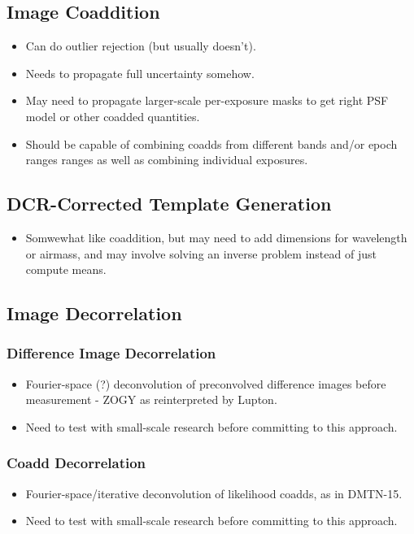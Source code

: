 \subsection{Image Coaddition}
\begin{itemize}
\item Can do outlier rejection (but usually doesn't).
\item Needs to propagate full uncertainty somehow.
\item May need to propagate larger-scale per-exposure masks to get right PSF model or other coadded quantities.
\item Should be capable of combining coadds from different bands and/or epoch ranges ranges as well as combining individual exposures.
\end{itemize}

\subsection{DCR-Corrected Template Generation}
\begin{itemize}
\item Somwewhat like coaddition, but may need to add dimensions for wavelength or airmass, and may involve solving an inverse problem instead of just compute means.
\end{itemize}

\subsection{Image Decorrelation}
\subsubsection{Difference Image Decorrelation}
\begin{itemize}
\item Fourier-space (?) deconvolution of preconvolved difference images before measurement - ZOGY as reinterpreted by Lupton.
\item Need to test with small-scale research before committing to this approach.
\end{itemize}
\subsubsection{Coadd Decorrelation}
\begin{itemize}
\item Fourier-space/iterative deconvolution of likelihood coadds, as in DMTN-15.
\item Need to test with small-scale research before committing to this approach.
\end{itemize}

